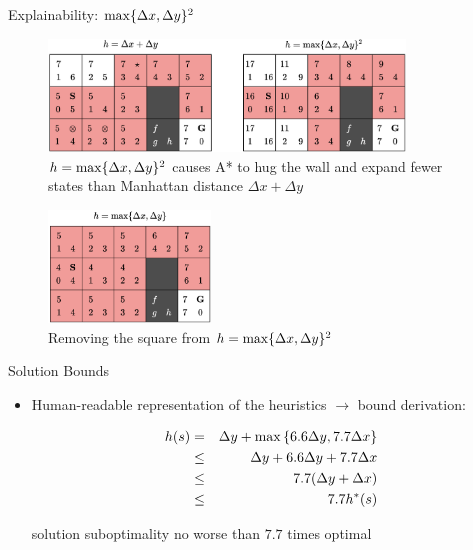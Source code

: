 \documentclass[aspectratio=169,usenames,dvipsnames]{beamer}
\newcommand{\bea}{\begin{eqnarray}}
\newcommand{\eea}{\end{eqnarray}}
\newcommand{\bei}{\begin{itemize}}
\newcommand{\eei}{\end{itemize}}
\newcommand{\ie}{\item}
\renewcommand{\max}{\operatornamewithlimits{max}\limits}
\numberwithin{equation}{section}
\numberwithin{theorem}{section}
\numberwithin{lem}{section}
\numberwithin{df}{section}
\begin{document}
\begin{frame}{Explainability: $\max\{\Delta x,\Delta y\}^2$}

\begin{figure}[htbp]
\centering
\includegraphics[height=3cm]{figs/synHexample.png}
\vspace{-0.25cm}
\caption{$h=\max\{\Delta x,\Delta y\}^2$ causes A* to hug the wall and expand fewer states than Manhattan distance $\Delta x + \Delta y$}
\label{fig:microExample}
\end{figure}

\vspace{-0.5cm}

\begin{figure}[t]
\centering
\includegraphics[height=3cm]{figs/synHexample2.png}
\vspace{-0.25cm}
\caption{Removing the square from $h=\max\{\Delta x,\Delta y\}^2$}
\label{fig:microExample2}
\end{figure}


\end{frame}



\begin{frame}{Solution Bounds}

\bei

\ie Human-readable representation of the heuristics $\to$ bound derivation:

\bea 
h(s) &=& \Delta y + \max\left\{6.6 \Delta y,7.7 \Delta x \right\} \nonumber \\ 
&\leq& \Delta y + 6.6 \Delta y + 7.7 \Delta x \nonumber \\ 
&\leq& 7.7 (\Delta y + \Delta x) \nonumber \\ 
&\leq& 7.7 h^*(s) \nonumber
\eea

\medskip

solution suboptimality no worse than $7.7$ times optimal

\eei


\end{frame}
\end{document}
